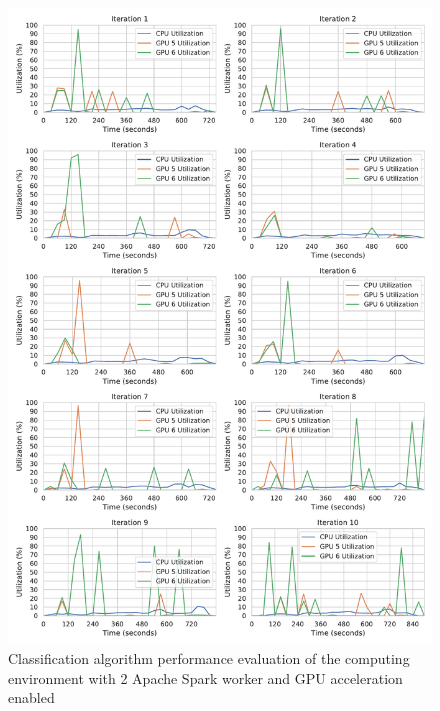 \begin{figure}[h]
\centering
\includegraphics[scale=0.53]{images/07_evaluation/mortgage/mortgage_gpu2_performance}
\caption{Classification algorithm performance evaluation of the computing environment with 2 Apache Spark worker and GPU acceleration enabled}
\label{fig:07_mortgage_static-cpu_results}
\end{figure}

